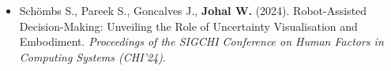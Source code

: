 {\begin{itemize}[nosep]

    \item Schömbs S., Pareek S., Goncalves J., \textbf{Johal W.} (2024). Robot-Assisted Decision-Making: Unveiling the Role of Uncertainty Visualisation and Embodiment. \textit{Proceedings of the SIGCHI Conference on Human Factors in Computing Systems (CHI'24)}.
\end{itemize}
}
